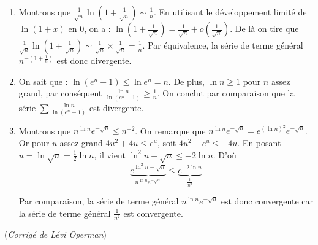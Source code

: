 {{\begin{enumerate}
\item
Montrons que $\frac{1}{\sqrt{n}}\ln{\left(1+\frac{1}{\sqrt{n}}\right)} \sim \frac{1}{n}$.
En utilisant le développement limité de $\ln (1 +x)$ en $0$, on a :
$\ln \left(1+\frac{1}{\sqrt{n}}\right) = \frac{1}{\sqrt{n}} + o\left(\frac{1}{\sqrt{n}}\right)$.
De là on tire que $\frac{1}{\sqrt{n}}\ln{\left(1+\frac{1}{\sqrt{n}}\right)} 
\sim \frac{1}{\sqrt{n}} \times \frac{1}{\sqrt{n}} = \frac{1}{n}$.
Par équivalence, la série de terme général $n^{-\left(1+\frac{1}{n}\right) }$ est donc divergente.

\item 
On sait que :
$\ln{(e^n-1)} \le \ln{e^n} = n$. De plus, $ \ln n \ge 1$ pour $n$  assez grand, par conséquent
$\frac{\ln n}{\ln (e^n-1)} \ge \frac{1}{n}$. On conclut par comparaison 
que la série $\sum \frac{\ln n }{\ln{(e^n-1)}}$ est divergente.

\item
Montrons que $n^{\ln n }e^{-\sqrt{n}} \le n^{-2}$.
On remarque que $ n^{\ln n }e^{-\sqrt{n}} = e^{(\ln n)^2}e^{-\sqrt{n}}$. 
Or pour $u$ assez grand $4u^2 + 4u \le e^u $, soit $4u^2 - e^u \le - 4u$.
En posant $u = \ln \sqrt{n} = \frac{1}{2} \ln n$, il vient $\ln^2{n} - \sqrt{n} \le -2\ln n$.
D'où 
\[
\underbrace{e^{\ln^2{n}-\sqrt{n}}}_{n^{\ln n }e^{-\sqrt{n}}} \le \underbrace{e^{-2\ln n }}_{\frac{1}{n^2}}
\]

Par comparaison, la série de terme général $n^{\ln n }e^{-\sqrt{n} }$ est donc convergente 
car la série de terme général $\frac{1}{n^2}$ est convergente.
\end{enumerate}
\medskip

(\emph{Corrigé de Lévi Operman})}
}